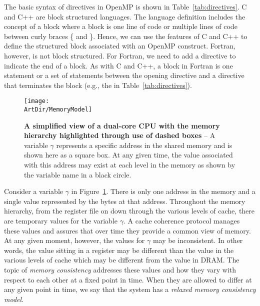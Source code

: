 The basic syntax of directives in OpenMP is shown in Table~\ref{tab:directives}. C and C++ are block structured
languages.  The language definition includes the concept of a block where a block is one line of code or 
multiple lines of code between curly braces \{ and \}.  Hence, we can use the features of C and C++
to define the structured block associated with an OpenMP construct.  Fortran, however, is not
block structured. For Fortran, we need to add a directive to indicate the end of a block.  
As with C and C++, a 
block in Fortran is one statement or a set of statements between the opening directive and a 
directive that terminates the block (e.g., the   in 
Table~\ref{tab:directives}).





\begin{figure}[!htbp]
\texttt{[image: \\ArtDir/MemoryModel]}
\centering
\caption
{\textbf{A simplified view of a dual-core CPU with the memory hierarchy highlighted through use of dashed boxes} -- \small  
A variable $\gamma$ represents a specific address in the shared memory and is shown here as a square box.  
At any given time, the value associated with this address may exist at each level in the memory as shown 
by the variable name in a black circle.
}
\label{fig:MemoryModel}
\end{figure}

Consider a variable $\gamma$ in Figure~\ref{fig:MemoryModel}.  There is only one address in the 
memory and a single value represented by the bytes at that address.  Throughout the memory hierarchy, from the
register file on down through the various levels of cache, there are temporary values for the variable $\gamma$.
A cache coherence protocol manages these values and assures 
that over time they provide a common view
of memory.  At any given moment, however, the values for $\gamma$ may be inconsistent.  In other words,
the value sitting in a register may be different than the value in the various levels of cache which may be different
from the value in DRAM.  The topic 
of \emph{memory consistency} addresses
these values and how they vary with respect to each other at a fixed point in time.  When they are allowed
to differ at any given point in time, we say that the system 
has a \emph{relaxed memory consistency model}.



